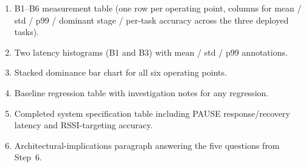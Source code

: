 \documentclass[11pt,letterpaper]{article}
\begin{document}
\begin{tcolorbox}[deliverable={Lab Handout 5-D Deliverable --- and Session 18 Final Deliverable}]
	\begin{enumerate}[leftmargin=1.2em]
		\item B1--B6 measurement table (one row per operating point, columns for mean / std / p99 / dominant stage / per-task accuracy across the three deployed tasks).
		\item Two latency histograms (B1 and B3) with mean / std / p99 annotations.
		\item Stacked dominance bar chart for all six operating points.
		\item Baseline regression table with investigation notes for any regression.
		\item Completed system specification table including PAUSE response/recovery latency and RSSI-targeting accuracy.
		\item Architectural-implications paragraph answering the five questions from Step~6.
	\end{enumerate}
\end{tcolorbox}

\printhandoutglossary
\end{document}

